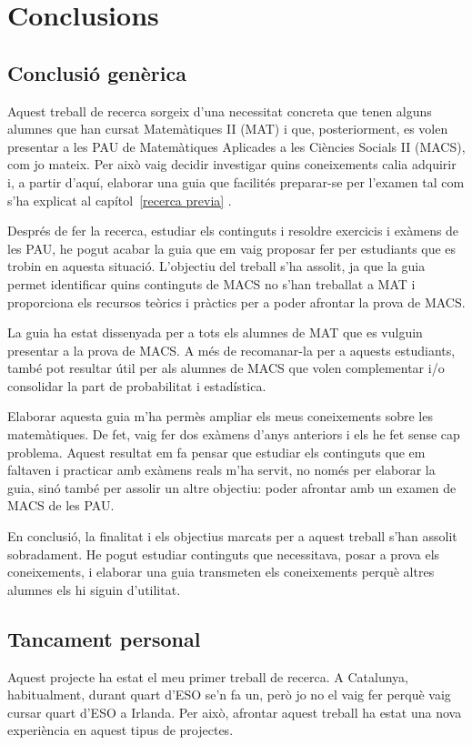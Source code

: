 \chapter{Conclusions}
\label{c:conclusions}
\section{Conclusió genèrica}
Aquest treball de recerca sorgeix d'una necessitat concreta que tenen alguns alumnes que han cursat Matemàtiques II (MAT) i que, posteriorment, es volen presentar a les PAU de Matemàtiques Aplicades a les Ciències Socials II (MACS), com jo mateix. Per això vaig decidir investigar quins coneixements calia adquirir i, a partir d'aquí, elaborar una guia que facilités preparar-se per l'examen tal com s'ha explicat al capítol~\ref{recerca previa} .

Després de fer la recerca, estudiar els continguts i resoldre exercicis i exàmens de les PAU, he pogut acabar la guia que em vaig proposar fer per estudiants que es trobin en aquesta situació. L'objectiu del treball s'ha assolit, ja que la guia permet identificar quins continguts de MACS no s'han treballat a MAT i proporciona els recursos teòrics i pràctics per a poder afrontar la prova de MACS.

La guia ha estat dissenyada per a tots els alumnes de MAT que es vulguin presentar a la prova de MACS. A més de recomanar-la per a aquests estudiants, també pot resultar útil per als alumnes de MACS que volen complementar i/o consolidar la part de probabilitat i estadística.

Elaborar aquesta guia m'ha permès ampliar els meus coneixements sobre les matemàtiques. De fet, vaig fer dos exàmens d'anys anteriors i els he fet sense cap problema. Aquest resultat em fa pensar que estudiar els continguts que em faltaven i practicar amb exàmens reals m'ha servit, no només per elaborar la guia, sinó també per assolir un altre objectiu: poder afrontar amb un examen de MACS de les PAU.

En conclusió, la finalitat i els objectius marcats per a aquest treball s'han assolit sobradament. He pogut estudiar continguts que necessitava, posar a prova els coneixements, i elaborar una guia transmeten els coneixements perquè altres alumnes els hi siguin d'utilitat.

\section{Tancament personal}
Aquest projecte ha estat el meu primer treball de recerca. A Catalunya, habitualment, durant quart d'ESO se'n fa un, però jo no el vaig fer perquè vaig cursar quart d'ESO a Irlanda. Per això, afrontar aquest treball ha estat una nova experiència en aquest tipus de projectes.

